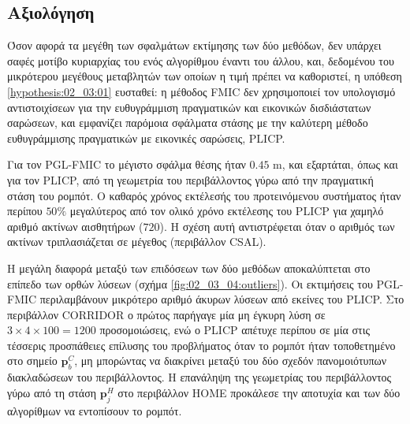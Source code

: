 \subsection{Αξιολόγηση}
\label{subsection:02_03_04:03}

Όσον αφορά τα μεγέθη των σφαλμάτων εκτίμησης των δύο μεθόδων, δεν υπάρχει σαφές
μοτίβο κυριαρχίας του ενός αλγορίθμου έναντι του άλλου, και, δεδομένου του
μικρότερου μεγέθους μεταβλητών των οποίων η τιμή πρέπει να καθοριστεί, η
υπόθεση \ref{hypothesis:02_03:01} ευσταθεί: η μέθοδος FMIC δεν χρησιμοποιεί
τον υπολογισμό αντιστοιχίσεων για την ευθυγράμμιση πραγματικών και εικονικών
δισδιάστατων σαρώσεων, και εμφανίζει παρόμοια σφάλματα στάσης με την καλύτερη
μέθοδο ευθυγράμμισης πραγματικών με εικονικές σαρώσεις, PLICP.

Για τον PGL-FMIC το μέγιστο σφάλμα θέσης ήταν $0.45$ m, και εξαρτάται, όπως και
για τον PLICP, από τη γεωμετρία του περιβάλλοντος γύρω από την πραγματική στάση
του ρομπότ.  Ο καθαρός χρόνος εκτέλεσής του προτεινόμενου συστήματος ήταν
περίπου $50\%$ μεγαλύτερος από τον ολικό χρόνο εκτέλεσης του PLICP για χαμηλό
αριθμό ακτίνων αισθητήρων ($720$). H σχέση αυτή αντιστρέφεται όταν ο αριθμός
των ακτίνων τριπλασιάζεται σε μέγεθος (περιβάλλον CSAL).

Η μεγάλη διαφορά μεταξύ των επιδόσεων των δύο μεθόδων αποκαλύπτεται στο επίπεδο
των ορθών λύσεων (σχήμα \ref{fig:02_03_04:outliers}). Οι εκτιμήσεις του
PGL-FMIC περιλαμβάνουν μικρότερο αριθμό άκυρων λύσεων από εκείνες του PLICP.
Στο περιβάλλον CORRIDOR ο πρώτος παρήγαγε μία μη έγκυρη λύση σε
$3\times4\times100 = 1200$  προσομοιώσεις, ενώ ο PLICP απέτυχε περίπου σε μία
στις τέσσερις προσπάθειες επίλυσης του προβλήματος όταν το ρομπότ ήταν
τοποθετημένο στο σημείο $\bm{p}_b^C$, μη μπορώντας να διακρίνει μεταξύ του δύο
σχεδόν πανομοιότυπων διακλαδώσεων του περιβάλλοντος. Η επανάληψη της γεωμετρίας
του περιβάλλοντος γύρω από τη στάση $\bm{p}_j^H$ στο περιβάλλον HOME προκάλεσε
την αποτυχία και των δύο αλγορίθμων να εντοπίσουν το ρομπότ.

